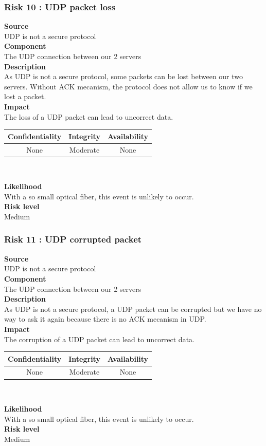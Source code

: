 \documentclass[a4paper,11pt]{article}
\begin{document}
\subsubsection{Risk 10 : UDP packet loss }
\textbf{Source} \\UDP is not a secure protocol \\
\textbf{Component} \\The UDP connection between our 2 servers\\
\textbf{Description}\\As UDP is not a secure protocol, some packets can be lost between our two servers. Without ACK mecanism, the protocol does not allow us to know if we lost a packet. \\
\textbf{Impact}\\
The loss of a UDP packet can lead to uncorrect data.\\
\begin{center}
\begin{tabular}{|c|c|c|}
\hline
\textbf{Confidentiality} & \textbf{Integrity} & \textbf{Availability} \\
\hline
None & Moderate & None \\
\hline
\end{tabular}\\
\end{center}
\textbf{Likelihood}\\ With a so small optical fiber, this event is unlikely to occur.\\
\textbf{Risk level}\\Medium\\

\subsubsection{Risk 11 : UDP corrupted packet}
\textbf{Source} \\UDP is not a secure protocol \\
\textbf{Component} \\The UDP connection between our 2 servers\\
\textbf{Description}\\As UDP is not a secure protocol, a UDP packet can be corrupted but we have no way to ask it again because there is no ACK mecanism in UDP. \\
\textbf{Impact}\\
The corruption of a UDP packet can lead to uncorrect data.\\
\begin{center}
\begin{tabular}{|c|c|c|}
\hline
\textbf{Confidentiality} & \textbf{Integrity} & \textbf{Availability} \\
\hline
None & Moderate & None \\
\hline
\end{tabular}\\
\end{center}
\textbf{Likelihood}\\ With a so small optical fiber, this event is unlikely to occur.\\
\textbf{Risk level}\\Medium\\
\end{document}
